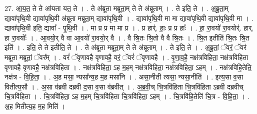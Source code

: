\documentclass[17pt]{extarticle}
\begin{document}
27. आ॒य॒त॒ ते ते आ॑यता यत॒ ते । . ते अ॑ब्रूता मब्रूता॒म् ते ते अ॑ब्रूताम् । . ते इति॒ ते । . अ॒ब्रू॒ता॒म् द्यावा॑पृथि॒वी द्यावा॑पृथि॒वी अ॑ब्रूता मब्रूता॒म् द्यावा॑पृथि॒वी । . द्यावा॑पृथि॒वी मा मा द्यावा॑पृथि॒वी द्यावा॑पृथि॒वी मा । . द्यावा॑पृथि॒वी इति॒ द्यावा᳚ - पृ॒थि॒वी । . मा प्र प्र मा मा प्र । . प्र हार्॑. हाः॒ प्र प्र हाः᳚ । . हा॒ रा॒वयो॑ रा॒वयोर्॑. हार्. हा रा॒वयोः᳚ । . आ॒वयो॒र् वै वा आ॒वयो॑ रा॒वयो॒र् वै । . वै श्रि॒तः श्रि॒तो वै वै श्रि॒तः । . श्रि॒त इतीति॑ श्रि॒तः श्रि॒त इति॑ । . इति॒ ते ते इतीति॒ ते । . ते अ॑ब्रूता मब्रूता॒म् ते ते अ॑ब्रूताम् । . ते इति॒ ते । . अ॒ब्रू॒तां॒ ॅवरं॒ ॅवर॑ मब्रूता मब्रूतां॒ ॅवर᳚म् । . वरं॑ ॅवृणावहै वृणावहै॒ वरं॒ ॅवरं॑ ॅवृणावहै । . वृ॒णा॒व॒है॒ नक्ष॑त्रविहिता॒ नक्ष॑त्रविहिता वृणावहै वृणावहै॒ नक्ष॑त्रविहिता । . नक्ष॑त्रविहिता॒ ऽह म॒हम् नक्ष॑त्रविहिता॒ नक्ष॑त्रविहिता॒ ऽहम् । . नक्ष॑त्रविहि॒तेति॒ नक्ष॑त्र - वि॒हि॒ता॒ । . अ॒ह मसा॒ न्यसा᳚न्य॒ह म॒ह मसा॑नि । . असा॒नीती त्यसा॒ न्यसा॒नीति॑ । . इत्य॒सा व॒सा वितीत्य॒सौ । . अ॒सा व॑ब्रवी दब्रवी द॒सा व॒सा व॑ब्रवीत् । . अ॒ब्र॒वी॒च् चि॒त्रवि॑हिता चि॒त्रवि॑हिता ऽब्रवी दब्रवीच् चि॒त्रवि॑हिता । . चि॒त्रवि॑हिता॒ ऽह म॒हम् चि॒त्रवि॑हिता चि॒त्रवि॑हिता॒ ऽहम् । . चि॒त्रवि॑हि॒तेति॑ चि॒त्र - वि॒हि॒ता॒ । . अ॒ह मितीत्य॒ह म॒ह मिति॑ । \newline
\end{document}
